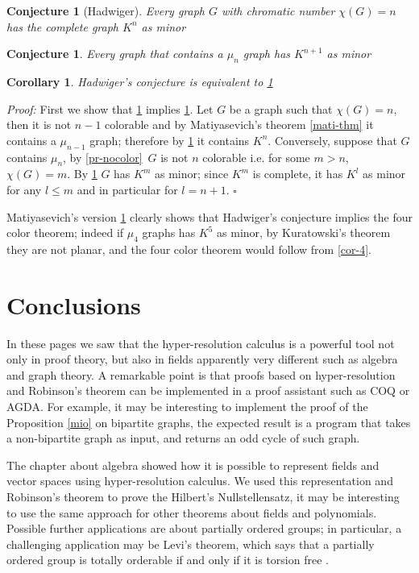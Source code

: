 \documentclass[a4paper,12pt,oneside]{book}
\newtheorem{corollary}[theorem]{Corollary}
\newtheorem{conjecture}[theorem]{Conjecture}
\newcommand*{\QED}{\hfill\ensuremath{\square}}
\begin{document}
\begin{conjecture}[Hadwiger]\label{hadw}
Every graph $G$ with chromatic number $\chi (G)=n$ has the complete graph $K^n$  as minor \end{conjecture}

\begin{conjecture}\label{hadw_mu}
Every graph that contains a $\mu_n$ graph has $K^{n+1}$  as minor \end{conjecture}

\begin{corollary}
Hadwiger's conjecture is equivalent to \ref{hadw_mu}\end{corollary}
\textit{Proof:} First we show that \ref{hadw_mu} implies \ref{hadw}. Let $G$ be a graph such that $\chi (G)=n$, then it is not $n-1$ colorable and by Matiyasevich's theorem \ref{mati-thm} it contains a $\mu_{n-1}$ graph; therefore by \ref{hadw_mu} it contains $K^n$.
Conversely, suppose that $G$ contains $\mu_n$, by \ref{pr-nocolor} $\,G$ is not $n$ colorable i.e. for some $m>n$, $\chi (G)=m$. By \ref{hadw} $G$ has $K^m$ as minor; since $K^m$ is complete, it has $K^l$ as minor for any $l\leq m$ and in particular for $l=n+1$. \QED

\noindent Matiyasevich's version \ref{hadw_mu} clearly shows  that Hadwiger's conjecture implies the four color theorem; indeed if $\mu_4$ graphs has $K^5$ as minor, by Kuratowski's theorem they are not planar, and the four color theorem would follow from \ref{cor-4}.


\chapter*{Conclusions}

In these pages we saw that the hyper-resolution calculus is a powerful tool not only in proof theory, but also in fields apparently very different such as algebra and graph theory. 
A remarkable point is that proofs based on hyper-resolution and Robinson's theorem can be implemented in a  proof assistant such as \textsc{COQ} or \textsc{AGDA}.
For example, it may be interesting to implement the proof of the Proposition \ref{mio} on bipartite graphs, the expected result is a program that takes a non-bipartite graph as input, and returns an odd cycle of such graph.

The chapter about algebra showed how it is possible to represent fields and vector spaces using hyper-resolution calculus. We used this representation and Robinson's theorem to prove the Hilbert's Nullstellensatz, it may be interesting to use the same approach for other theorems about fields and polynomials.
Possible further applications are about partially ordered groups; in particular, a challenging application may be Levi's theorem, which says that a partially ordered group is totally orderable if and only if it is torsion free \cite{fuchs}. 
\end{document}
